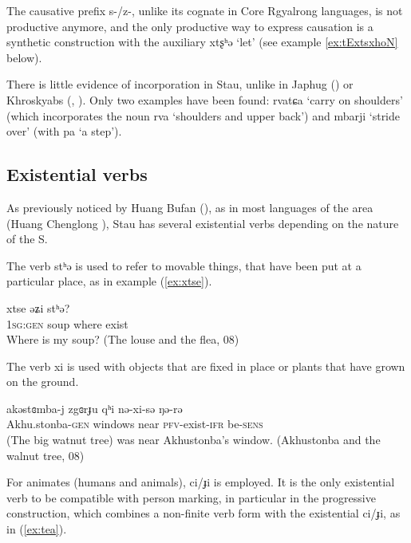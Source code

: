\documentclass[oneside,a4paper,11pt]{article}
\newcommand{\ipa}[1]{{\phon #1}} %
\begin{document}
The causative prefix \ipa{s-/z-}, unlike its cognate in Core Rgyalrong languages, is not productive anymore, and the only productive way to express causation is a synthetic construction with the auxiliary \ipa{xtʂʰə} `let' (see example \ref{ex:tExtsxhoN} below).
 
 
 There is little evidence of incorporation in Stau, unlike in Japhug (\citealt{jacques12incorp}) or Khroskyabs (\citealt{lai13affixale}, \citealt{lai14person}). Only two examples have been found: \ipa{rvatɕa} `carry on shoulders' (which incorporates the noun \ipa{rva} `shoulders and upper back') and \ipa{mbarji} `stride over' (with \ipa{pa}  `a step').

\subsection{Existential verbs}
As previously noticed by  Huang Bufan (\citeyear[38]{huangbf91daofu}), as in most languages of the area (Huang Chenglong \citeyear{huangcl13cunzai}), Stau has several existential verbs depending on the nature of the S.   

The verb \ipa{stʰə} is used to refer to movable things, that have been put at a particular place, as in example (\ref{ex:xtse}).

\begin{exe}
\ex \label{ex:xtse}
\gll \ipa{ŋi} 	\ipa{xtse} 	\ipa{əʑi} 	\ipa{stʰə?} 	  \\
\textsc{1sg:gen} soup where exist \\
\glt Where is my soup? (The louse and the flea, 08)
\end{exe}
 
The verb \ipa{xi} is used with objects that are fixed in place or plants that have grown on the ground.

\begin{exe}
\ex \label{ex:zgorJu}
\gll
\ipa{akəstɞmba-j} 	\ipa{zgɞrɟu} 	\ipa{qʰi} 	\ipa{nə-xi-sə} 	\ipa{ŋə-rə} \\
Akhu.stonba-\textsc{gen} windows near \textsc{pfv}-exist-\textsc{ifr} be-\textsc{sens} \\
\glt (The big watnut tree) was near Akhustonba's window. (Akhustonba and the walnut tree, 08)
\end{exe}


For animates (humans and animals),  \ipa{ci/ɟi} is employed. It is the only existential verb to be compatible with person marking, in particular in the progressive construction, which combines a non-finite verb form with the existential \ipa{ci/ɟi}, as in (\ref{ex:tea}).
 
\end{document}
